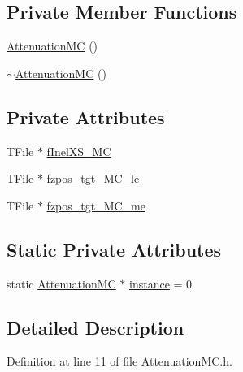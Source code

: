 \subsection*{Private Member Functions}
\begin{DoxyCompactItemize}
\item 
\hyperlink{class_neutrino_flux_reweight_1_1_attenuation_m_c_a53038aecee97225821a39b29f59dde79}{Attenuation\-M\-C} ()
\item 
\hyperlink{class_neutrino_flux_reweight_1_1_attenuation_m_c_ae87eeab4f056bf9fae23433d879ff5c0}{$\sim$\-Attenuation\-M\-C} ()
\end{DoxyCompactItemize}
\subsection*{Private Attributes}
\begin{DoxyCompactItemize}
\item 
T\-File $\ast$ \hyperlink{class_neutrino_flux_reweight_1_1_attenuation_m_c_a5c8c620e955ec534263d78013c1c086a}{f\-Inel\-X\-S\-\_\-\-M\-C}
\item 
T\-File $\ast$ \hyperlink{class_neutrino_flux_reweight_1_1_attenuation_m_c_a66fcb5745e72eda64f9081b5b0ef4399}{fzpos\-\_\-tgt\-\_\-\-M\-C\-\_\-le}
\item 
T\-File $\ast$ \hyperlink{class_neutrino_flux_reweight_1_1_attenuation_m_c_a93e5ae3f1982c3dddd6c57ea47e230ea}{fzpos\-\_\-tgt\-\_\-\-M\-C\-\_\-me}
\end{DoxyCompactItemize}
\subsection*{Static Private Attributes}
\begin{DoxyCompactItemize}
\item 
static \hyperlink{class_neutrino_flux_reweight_1_1_attenuation_m_c}{Attenuation\-M\-C} $\ast$ \hyperlink{class_neutrino_flux_reweight_1_1_attenuation_m_c_ab75129542683e731060a5911a27e93fc}{instance} = 0
\end{DoxyCompactItemize}


\subsection{Detailed Description}


Definition at line 11 of file Attenuation\-M\-C.\-h.



